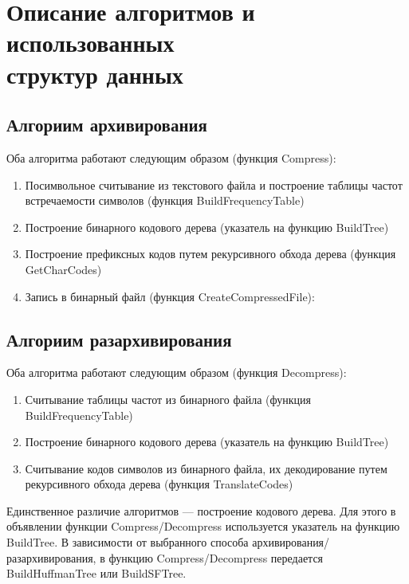 \documentclass[a4paper,12pt]{article} %
\begin{document}
    \section{Описание алгоритмов и использованных\\ структур данных}
    \subsection{Алгориим архивирования}
    Оба алгоритма работают следующим образом (функция Compress):
    \begin{enumerate}
        \item
        Посимвольное считывание из текстового файла и построение таблицы частот
        встречаемости символов (функция BuildFrequencyTable)
        \item
        Построение бинарного кодового дерева (указатель на функцию BuildTree)
        \item
        Построение префиксных кодов путем рекурсивного обхода дерева (функция GetCharCodes)
        \item
        Запись в бинарный файл (функция CreateCompressedFile):
    \end{enumerate}
    \subsection{Алгориим разархивирования}
    Оба алгоритма работают следующим образом (функция Decompress):
    \begin{enumerate}
        \item
        Считывание таблицы частот из бинарного файла (функция BuildFrequencyTable)
        \item
        Построение бинарного кодового дерева (указатель на функцию BuildTree)
        \item
        Считывание кодов символов из бинарного файла, их декодирование путем
        рекурсивного обхода дерева (функция TranslateCodes)
    \end{enumerate}
    Единственное различие алгоритмов --- построение кодового дерева. Для этого в объявлении функции Compress/Decompress используется указатель на функцию BuildTree. 
    В зависимости от выбранного способа архивирования/разархивирования, в функцию Compress/Decompress передается 
    BuildHuffmanTree или BuildSFTree.
\end{document}
